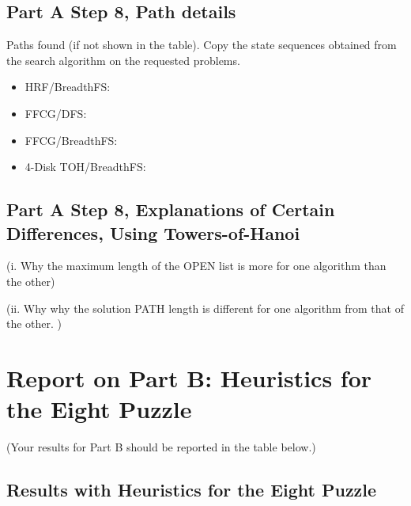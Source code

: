\documentclass{article}
\begin{document}
\subsection{Part A Step 8, Path details}
 Paths found (if not shown in the table).  Copy the state sequences
 obtained from the search algorithm on the requested problems.

 \begin{itemize}
 \item HRF/BreadthFS:
 \item FFCG/DFS: 
 \item FFCG/BreadthFS:
 \item 4-Disk TOH/BreadthFS:
 \end{itemize}

 \subsection{Part A Step 8,  Explanations of Certain Differences, Using Towers-of-Hanoi  }

\begin{paragraph}
(i. Why the maximum length of the OPEN list is more for one algorithm
than the other)

\end{paragraph}
\begin{paragraph}
(ii. Why why the solution PATH length is different for one algorithm from that of the other. )

\end{paragraph}

\newpage
\section{Report on Part B: Heuristics for the Eight Puzzle}

(Your results for Part B should be reported in the table below.)


\subsection{Results with Heuristics for the Eight Puzzle}
\end{document}
